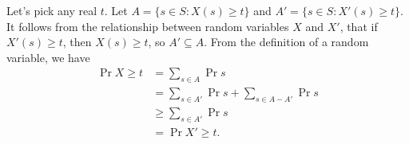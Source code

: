 Let's pick any real $t$.
Let $A=\{s\in S:X(s)\ge t\}$ and $A'=\{s\in S:X'(s)\ge t\}$.
It follows from the relationship between random variables $X$ and $X'$, that if $X'(s)\ge t$, then $X(s)\ge t$, so $A'\subseteq A$.
From the definition of a random variable, we have
\begin{align*}
    \Pr{X\ge t} &= \sum_{s\in A}\Pr{s} \\
    &= \sum_{s\in A'}\Pr{s}+\sum_{s\in A-A'}\Pr{s} \\
    &\ge \sum_{s\in A'}\Pr{s} \\
    &= \Pr{X'\ge t}.
\end{align*}
